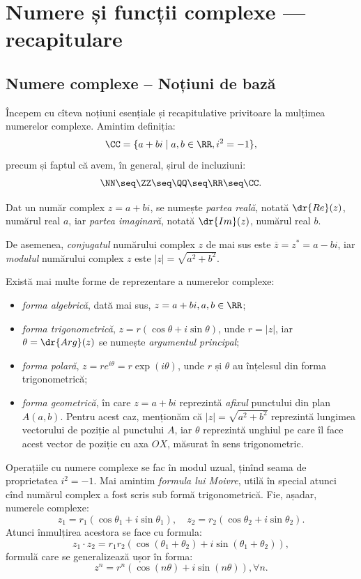 
\chapter{Numere și funcții complexe --- recapitulare}

\section{Numere complexe -- Noțiuni de bază}

Începem cu cîteva noțiuni esențiale și recapitulative privitoare la mulțimea
numerelor complexe. Amintim definiția:
\[
  \CC = \{ a + bi \mid a, b \in \RR, i^2 = -1 \},
\]
precum și faptul că avem, în general, șirul de incluziuni:
\[
  \NN \seq \ZZ \seq \QQ \seq \RR \seq \CC.
\]

Dat un număr complex $ z = a + bi $, se numește \emph{partea reală},
notată $ \dr{Re}(z) $, numărul real $ a $, iar \emph{partea imaginară},
notată $ \dr{Im}(z) $, numărul real $ b $.

De asemenea, \emph{conjugatul} numărului complex $ z $ de mai sus este
$ \overline{z} = z^\ast = a - bi $, iar \emph{modulul} numărului complex
$ z $ este $ |z| = \sqrt{a^2 + b^2} $.

Există mai multe forme de reprezentare a numerelor complexe:
\begin{itemize}
\item \emph{forma algebrică}, dată mai sus, $ z = a + bi, a, b \in \RR $;
\item \emph{forma trigonometrică}, $ z = r(\cos \theta + i \sin \theta) $,
  unde $ r = |z| $, iar $ \theta = \dr{Arg}(z) $ se numește \emph{argumentul %
  principal};
\item \emph{forma polară}, $ z = r e^{i\theta} = r \exp(i \theta) $, unde
  $ r $ și $ \theta $ au înțelesul din forma trigonometrică;
\item \emph{forma geometrică}, în care $ z = a + bi $ reprezintă
  \emph{afixul} punctului din plan $ A(a, b) $. Pentru acest caz, menționăm
  că $ |z| = \sqrt{a^2 + b^2} $ reprezintă lungimea vectorului de poziție
  al punctului $ A $, iar $ \theta $ reprezintă unghiul pe care îl face
  acest vector de poziție cu axa $ OX $, măsurat în sens trigonometric.
\end{itemize}

Operațiile cu numere complexe se fac în modul uzual, ținînd seama de
proprietatea $ i^2 = -1 $. Mai amintim \emph{formula lui Moivre}, utilă
în special atunci cînd numărul complex a fost scris sub formă trigonometrică.
Fie, așadar, numerele complexe:
\[
  z_1 = r_1(\cos \theta_1 + i\sin\theta_1), \quad %
  z_2 = r_2(\cos \theta_2 + i \sin\theta_2).
\]
Atunci înmulțirea acestora se face cu formula:
\[
  z_1 \cdot z_2 = r_1r_2 \left( \cos(\theta_1 + \theta_2) + i \sin(\theta_1 + \theta_2) \right),
\]
formulă care se generalizează ușor în forma:
\[
  z^n = r^n(\cos (n\theta) + i \sin (n\theta)), \forall n.
\]

